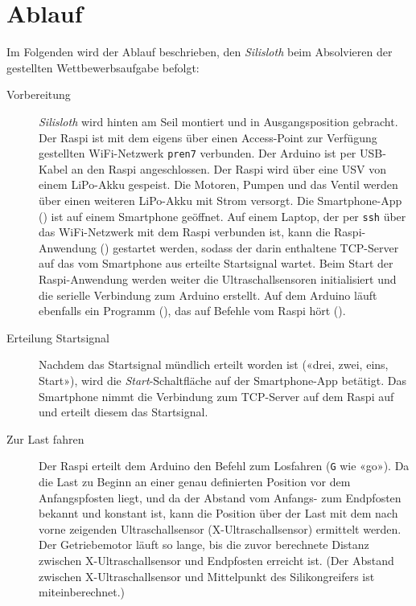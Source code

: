 \section{Ablauf}
\label{sec:ablauf}

Im Folgenden wird der Ablauf beschrieben, den \textit{Silisloth} beim Absolvieren der gestellten Wettbewerbsaufgabe befolgt:

\begin{description}
    \item[Vorbereitung] \textit{Silisloth} wird hinten am Seil montiert und in Ausgangsposition gebracht. Der Raspi ist mit dem eigens über einen Access-Point zur Verfügung gestellten WiFi-Netzwerk \texttt{pren7} verbunden. Der Arduino ist per USB-Kabel an den Raspi angeschlossen. Der Raspi wird über eine USV von einem LiPo-Akku gespeist. Die Motoren, Pumpen und das Ventil werden über einen weiteren LiPo-Akku mit Strom versorgt. Die Smartphone-App () ist auf einem Smartphone geöffnet. Auf einem Laptop, der per \texttt{ssh} über das WiFi-Netzwerk mit dem Raspi verbunden ist, kann die Raspi-Anwendung () gestartet werden, sodass der darin enthaltene TCP-Server auf das vom Smartphone aus erteilte Startsignal wartet. Beim Start der Raspi-Anwendung werden weiter die Ultraschallsensoren initialisiert und die serielle Verbindung zum Arduino erstellt. Auf dem Arduino läuft ebenfalls ein Programm (), das auf Befehle vom Raspi hört ().
    \item[Erteilung Startsignal] Nachdem das Startsignal mündlich erteilt worden ist («drei, zwei, eins, Start»), wird die \textit{Start}-Schaltfläche auf der Smartphone-App betätigt. Das Smartphone nimmt die Verbindung zum TCP-Server auf dem Raspi auf und erteilt diesem das Startsignal.
    \item[Zur Last fahren] Der Raspi erteilt dem Arduino den Befehl zum Losfahren (\texttt{G} wie «go»). Da die Last zu Beginn an einer genau definierten Position vor dem Anfangspfosten liegt, und da der Abstand vom Anfangs- zum Endpfosten bekannt und konstant ist, kann die Position über der Last mit dem nach vorne zeigenden Ultraschallsensor (X-Ultraschallsensor) ermittelt werden. Der Getriebemotor läuft so lange, bis die zuvor berechnete Distanz zwischen X-Ultraschallsensor und Endpfosten erreicht ist. (Der Abstand zwischen X-Ultraschallsensor und Mittelpunkt des Silikongreifers ist miteinberechnet.)

\end{description}
